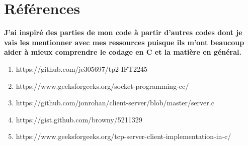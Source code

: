 \documentclass{article}
\begin{document}
\section{Références}
\textbf{J'ai inspiré des parties de mon code à partir d'autres codes dont je vais les mentionner avec mes ressources puisque ils m'ont beaucoup aider à mieux comprendre le codage en C et la matière en général.}
\begin{enumerate}
\item{https://github.com/jc305697/tp2-IFT2245}
\item{https://www.geeksforgeeks.org/socket-programming-cc/}
\item{https://github.com/jonrohan/client-server/blob/master/server.c}
\item{https://gist.github.com/browny/5211329}
\item{https://www.geeksforgeeks.org/tcp-server-client-implementation-in-c/}
\end{enumerate} 
\end{document}
